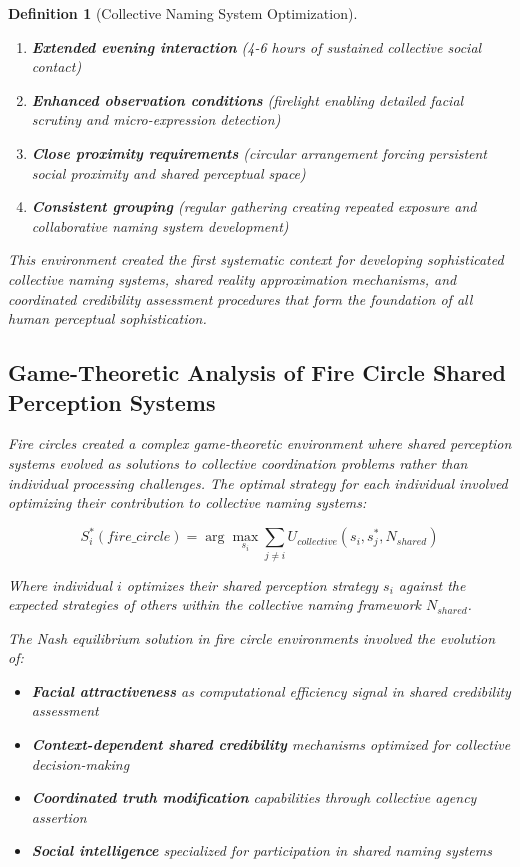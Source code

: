 \documentclass[12pt]{article}
\newtheorem{definition}{Definition}
\begin{document}
\begin{definition}[Collective Naming System Optimization]
\begin{enumerate}
\item \textbf{Extended evening interaction} (4-6 hours of sustained collective social contact)
\item \textbf{Enhanced observation conditions} (firelight enabling detailed facial scrutiny and micro-expression detection)
\item \textbf{Close proximity requirements} (circular arrangement forcing persistent social proximity and shared perceptual space)
\item \textbf{Consistent grouping} (regular gathering creating repeated exposure and collaborative naming system development)
\end{enumerate}

This environment created the first systematic context for developing sophisticated collective naming systems, shared reality approximation mechanisms, and coordinated credibility assessment procedures that form the foundation of all human perceptual sophistication.

\subsection{Game-Theoretic Analysis of Fire Circle Shared Perception Systems}

Fire circles created a complex game-theoretic environment where shared perception systems evolved as solutions to collective coordination problems rather than individual processing challenges. The optimal strategy for each individual involved optimizing their contribution to collective naming systems:

$$S_i^*(fire\_circle) = \arg\max_{s_i} \sum_{j \neq i} U_{collective}(s_i, s_j^*, N_{shared})$$

Where individual $i$ optimizes their shared perception strategy $s_i$ against the expected strategies of others within the collective naming framework $N_{shared}$.

The Nash equilibrium solution in fire circle environments involved the evolution of:

\begin{itemize}
\item \textbf{Facial attractiveness} as computational efficiency signal in shared credibility assessment
\item \textbf{Context-dependent shared credibility} mechanisms optimized for collective decision-making
\item \textbf{Coordinated truth modification} capabilities through collective agency assertion
\item \textbf{Social intelligence} specialized for participation in shared naming systems
\end{itemize}


\end{definition}
\end{document}
